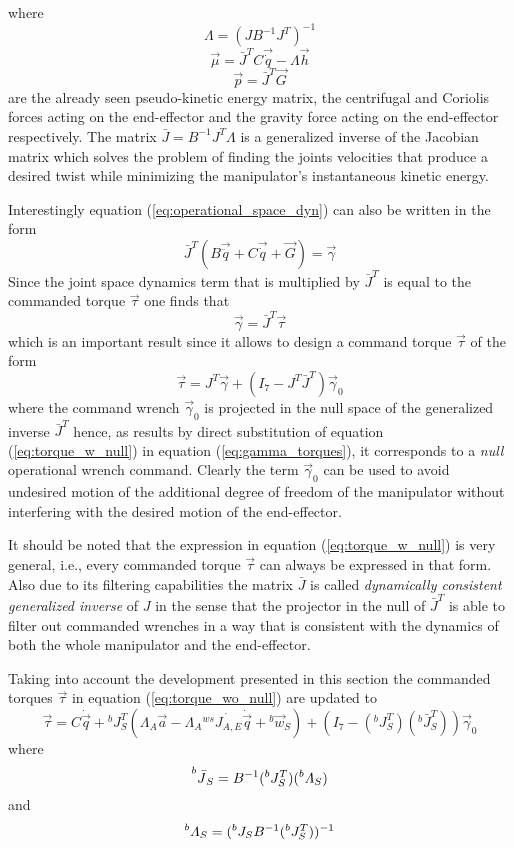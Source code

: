 where
\[
\Lambda = (J B^{-1} J^{T})^{-1}
\]
\[
\vec{\mu} = \bar{J}^{T} C \vec{\dot{q}} - \Lambda \vec{h}
\]
\[
\vec{p} = \bar{J}^T \vec{G}
\]
are the already seen pseudo-kinetic energy matrix, the centrifugal and
Coriolis forces acting on the end-effector and the gravity force acting on the end-effector
respectively.
The matrix $\bar{J} = B^{-1} J^{T} \Lambda$ is a generalized inverse of the Jacobian matrix
which solves the problem of finding the joints velocities that produce a desired twist
while minimizing the manipulator's instantaneous kinetic energy.
\par
Interestingly equation (\ref{eq:operational_space_dyn}) can also be written in the form
\[
\bar{J}^{T} (B \vec{\ddot{q}} + C \vec{\dot{q}} + \vec{G}) = \vec{\gamma}
\]
Since the joint space dynamics term that is multiplied by $\bar{J}^{T}$ is equal to the
commanded torque $\vec{\tau}$ one finds that
\begin{equation}\label{eq:gamma_torques}
  \vec{\gamma} = \bar{J}^{T} \vec{\tau}
\end{equation}
which is an important result since it allows to design a command torque $\vec{\tau}$ of the form
\begin{equation}\label{eq:torque_w_null}
  \vec{\tau} = J^{T} \vec{\gamma} + (I_7 - J^{T}\bar{J}^{T}) \vec{\gamma}_{0}
\end{equation}
where the command wrench $\vec{\gamma}_{0}$ is projected in the null space of the
generalized inverse $\bar{J}^{T}$ hence, as results by direct substitution of equation
(\ref{eq:torque_w_null}) in equation (\ref{eq:gamma_torques}), it corresponds
to a \emph{null} operational wrench command. Clearly the term $\vec{\gamma}_{0}$ can
be used to avoid undesired motion of the additional degree of freedom of the manipulator
without interfering with the desired motion of the end-effector.
\par
It should be noted that the expression in equation (\ref{eq:torque_w_null}) is very general, i.e.,
every commanded torque $\vec{\tau}$ can always be expressed in that form.
Also due to its filtering capabilities the matrix $\bar{J}$ is called \emph{dynamically consistent generalized inverse} 
of $J$ in the sense that the projector in the null of $\bar{J}^T$ is able 
to filter out commanded wrenches in a way that is consistent with the dynamics of both the
whole manipulator and the end-effector.
\par
Taking into account the development presented in this section the commanded torques $\vec{\tau}$
in equation (\ref{eq:torque_wo_null}) are updated to
\begin{equation}\label{eq:torqu_w_null_1}
  \vec{\tau} = C \dot{\vec{q}} + {}^{b}J^{T}_{S} ( \Lambda_A \vec{a} - \Lambda_A {}^{ws} \dot{J_{A,E}} \dot{\vec{q}} + {}^b\vec{w}_{S}) +
  (I_7 - ({}^{b}J^{T}_{S}) ({}^{b} \bar{J}^{T}_{S})) \vec{\gamma}_{0}
\end{equation}
where
\[
\prescript{b}{}{\bar{J}}_{S} = B^{-1} ({}^{b} J^{T}_{S}) ({}^{b} \Lambda_{S})
\]
and
\[
\prescript{b}{}{\Lambda}_{S} = ({}^{b} J_{S} B^{-1} ({}^{b} J^{T}_{S}))^{-1}
\]

